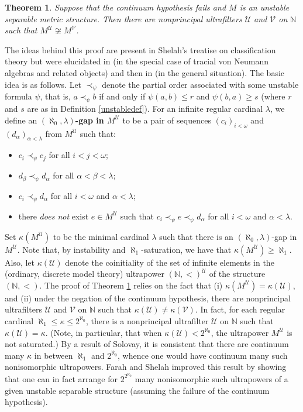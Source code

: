 \documentclass[12pt]{amsart}
\newtheorem{thm}{Theorem}[section]
\theoremstyle{definition}
\def\bb{\mathbb}
\def\bb{\mathbb}
\def\cal{\mathcal}
\def\u{\mathsf 1}
\def \u{\mathcal U}
\begin{document}
\begin{thm}\label{unstablenoniso}
Suppose that the continuum hypothesis fails and $M$ is an unstable separable metric structure.  Then there are nonprincipal ultrafilters $\u$ and $\cal V$ on $\bb N$ such that $M^\u\not\cong M^{\cal V}$.
\end{thm}

The ideas behind this proof are present in Shelah's treatise \cite{shelah} on classification theory but were elucidated in \cite[Proposition 2.6]{mtoa1} (in the special case of tracial von Neumann algebras and related objects) and then in \cite[Theorem 5.6(2)]{mtoa2} (in the general situation).  The basic idea is as follows.  Let $\prec_\psi$ denote the partial order associated with some unstable formula $\psi$, that is, $a\prec_\psi b$ if and only if $\psi(a,b)\leq r$ and $\psi(b,a)\geq s$ (where $r$ and $s$ are as in Definition \ref{unstabledef}).  For an infinite regular cardinal $\lambda$, we define an \textbf{$(\aleph_0,\lambda)$-gap in $M^\u$} to be a pair of sequences $(c_i)_{i<\omega}$ and $(d_\alpha)_{\alpha<\lambda}$ from $M^\u$ such that:
\begin{itemize}
    \item $c_i\prec_\psi c_j$ for all $i<j<\omega$;
    \item $d_\beta\prec_\psi d_\alpha$ for all $\alpha<\beta<\lambda$;
    \item $c_i\prec_\psi d_\alpha$ for all $i<\omega$ and $\alpha<\lambda$;
    \item there \emph{does not} exist $e\in M^\u$ such that $c_i\prec_\psi e\prec_\psi d_\alpha$ for all $i<\omega$ and $\alpha<\lambda$.
\end{itemize}
Set $\kappa(M^\u)$ to be the minimal cardinal $\lambda$ such that there is an $(\aleph_0,\lambda)$-gap in $M^\u$.  Note that, by instability and $\aleph_1$-saturation, we have that $\kappa(M^\u)\geq \aleph_1$.  Also, let $\kappa(\u)$ denote the coinitiality of the set of infinite elements in the (ordinary, discrete model theory) ultrapower $(\bb N,<)^\u$ of the structure $(\bb N,<)$.   The proof of Theorem \ref{unstablenoniso} relies on the fact that (i) $\kappa(M^\u)=\kappa(\u)$, and (ii) under the negation of the continuum hypothesis, there are nonprincipal ultrafilters $\u$ and $\cal V$ on $\bb N$ such that $\kappa(\u)\not=\kappa(\cal V)$.  In fact, for each regular cardinal $\aleph_1\leq \kappa\leq 2^{\aleph_0}$, there is a nonprincipal ultrafilter $\u$ on $\bb N$ such that $\kappa(\u)=\kappa$.  (Note, in particular, that when $\kappa(\u)<2^{\aleph_0}$, the ultrapower $M^\u$ is not saturated.)  By a result of Solovay, it is consistent that there are continuum many $\kappa$ in between $\aleph_1$ and $2^{\aleph_0}$, whence one would have continuum many such nonisomorphic ultrapowers.  Farah and Shelah \cite{farahshelah} improved this result by showing that one can in fact arrange for $2^{2^{\aleph_0}}$ many nonisomorphic such ultrapowers of a given unstable separable structure (assuming the failure of the continuum hypothesis).  
\end{document}
